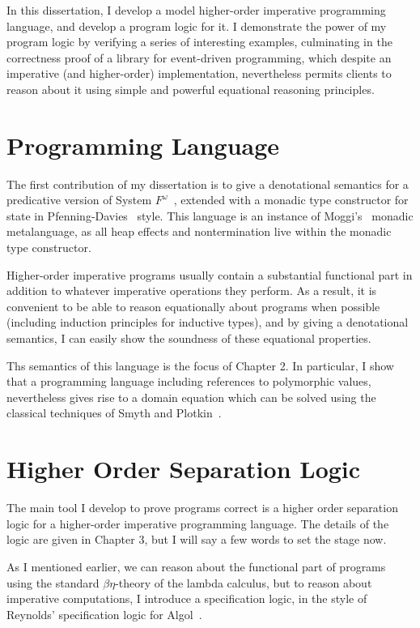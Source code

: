 In this dissertation, I develop a model higher-order imperative
programming language, and develop a program logic for it. I
demonstrate the power of my program logic by verifying a series of
interesting examples, culminating in the correctness proof of a
library for event-driven programming, which despite an imperative (and
higher-order) implementation, nevertheless permits clients to reason
about it using simple and powerful equational reasoning principles.

\section{Programming Language}

The first contribution of my dissertation is to give a denotational
semantics for a predicative version of System
$F^\omega$~\cite{girard-thesis}, extended with a monadic type
constructor for state in Pfenning-Davies~\cite{pfenning-davies}
style. This language is an instance of Moggi's~\cite{moggi-monads}
monadic metalanguage, as all heap effects and nontermination live
within the monadic type constructor.

Higher-order imperative programs usually contain a substantial
functional part in addition to whatever imperative operations they
perform. As a result, it is convenient to be able to reason
equationally about programs when possible (including induction
principles for inductive types), and by giving a denotational
semantics, I can easily show the soundness of these equational
properties.

Ths semantics of this language is the focus of Chapter 2. In
particular, I show that a programming language including references to
polymorphic values, nevertheless gives rise to a domain equation which
can be solved using the classical techniques of Smyth and
Plotkin~\cite{smyth-plotkin}.

\section{Higher Order Separation Logic}

The main tool I develop to prove programs correct is a higher order
separation logic for a higher-order imperative programming
language. The details of the logic are given in Chapter 3, but 
I will say a few words to set the stage now. 

As I mentioned earlier, we can reason about the functional part of
programs using the standard $\beta\eta$-theory of the lambda calculus,
but to reason about imperative computations, I introduce a
specification logic, in the style of Reynolds' specification logic for
Algol~\citep{spec-logic}.

